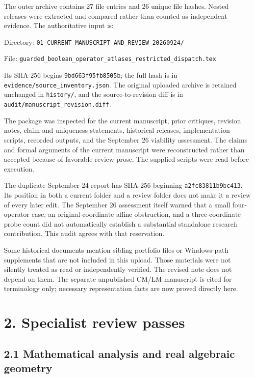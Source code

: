 \documentclass[
  11pt,
]{article}
\begin{document}
The outer archive contains 27 file entries and 26 unique file hashes.
Nested releases were extracted and compared rather than counted as
independent evidence. The authoritative input is:

Directory: \texttt{01\_CURRENT\_MANUSCRIPT\_AND\_REVIEW\_20260924/}

File:
\texttt{guarded\_boolean\_operator\_atlases\_restricted\_dispatch.tex}

Its SHA-256 begins \texttt{9bd663f95fb8505b}; the full hash is in
\texttt{evidence/source\_inventory.json}. The original uploaded archive
is retained unchanged in \texttt{history/}, and the source-to-revision
diff is in \texttt{audit/manuscript\_revision.diff}.

The package was inspected for the current manuscript, prior critiques,
revision notes, claim and uniqueness statements, historical releases,
implementation scripts, recorded outputs, and the September 26 viability
assessment. The claims and formal arguments of the current manuscript
were reconstructed rather than accepted because of favorable review
prose. The supplied scripts were read before execution.

The duplicate September 24 report has SHA-256 beginning
\texttt{a2fc83811b9bc413}. Its position in both a current folder and a
review folder does not make it a review of every later edit. The
September 26 assessment itself warned that a small four-operator case,
an original-coordinate affine obstruction, and a three-coordinate probe
count did not automatically establish a substantial standalone research
contribution. This audit agrees with that reservation.

Some historical documents mention sibling portfolio files or
Windows-path supplements that are not included in this upload. Those
materials were not silently treated as read or independently verified.
The revised note does not depend on them. The separate unpublished CM/LM
manuscript is cited for terminology only; necessary representation facts
are now proved directly here.

\section{2. Specialist review passes}\label{specialist-review-passes}

\subsection{2.1 Mathematical analysis and real algebraic
geometry}\label{mathematical-analysis-and-real-algebraic-geometry}
\end{document}
